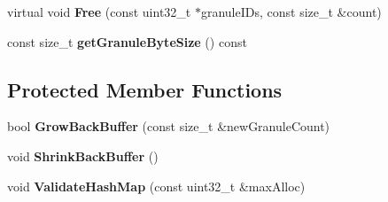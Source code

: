 \begin{DoxyCompactItemize}
\item 
virtual void {\bfseries Free} (const uint32\+\_\+t $\ast$granule\+I\+Ds, const size\+\_\+t \&count)\hypertarget{classirr_1_1core_1_1IMetaGranularBuffer_aebed18f1992fb10890115ec68f1c52de}{}\label{classirr_1_1core_1_1IMetaGranularBuffer_aebed18f1992fb10890115ec68f1c52de}

\item 
const size\+\_\+t {\bfseries get\+Granule\+Byte\+Size} () const \hypertarget{classirr_1_1core_1_1IMetaGranularBuffer_a3d0a821f552e65b7c9ea7b3dc3de8702}{}\label{classirr_1_1core_1_1IMetaGranularBuffer_a3d0a821f552e65b7c9ea7b3dc3de8702}

\end{DoxyCompactItemize}
\subsection*{Protected Member Functions}
\begin{DoxyCompactItemize}
\item 
bool {\bfseries Grow\+Back\+Buffer} (const size\+\_\+t \&new\+Granule\+Count)\hypertarget{classirr_1_1core_1_1IMetaGranularBuffer_a6b167f07ffc2aaf61c13c2aeca9fee04}{}\label{classirr_1_1core_1_1IMetaGranularBuffer_a6b167f07ffc2aaf61c13c2aeca9fee04}

\item 
void {\bfseries Shrink\+Back\+Buffer} ()\hypertarget{classirr_1_1core_1_1IMetaGranularBuffer_acbbdca59a6c48bfc8e32e29aab8ebfe6}{}\label{classirr_1_1core_1_1IMetaGranularBuffer_acbbdca59a6c48bfc8e32e29aab8ebfe6}

\item 
void {\bfseries Validate\+Hash\+Map} (const uint32\+\_\+t \&max\+Alloc)\hypertarget{classirr_1_1core_1_1IMetaGranularBuffer_a8570b25dfec2219c63e9c2782f61e3b1}{}\label{classirr_1_1core_1_1IMetaGranularBuffer_a8570b25dfec2219c63e9c2782f61e3b1}

\end{DoxyCompactItemize}
